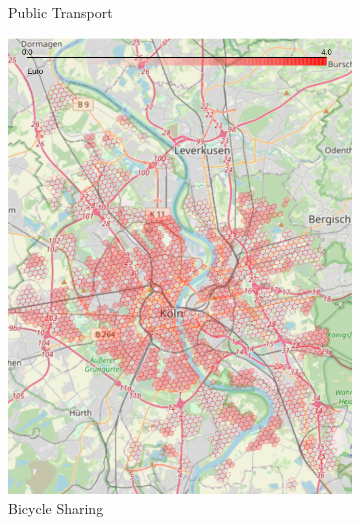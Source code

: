 \begin{figure}
\begin{subfigure}[b]{0.3\textwidth}
         \caption{Public Transport}
         \label{fig:public_transport_cost_map}
     \end{subfigure}
     \hfill
     \begin{subfigure}[b]{0.3\textwidth}
         \centering
         \includegraphics[width=\textwidth]{Figures/results/cost/bicycle_cost_map}
         \caption{Bicycle Sharing}
         \label{fig:bicycle_cost_map}
     \end{subfigure}
     \hfill
     \begin{subfigure}[b]{0.3\textwidth}
         \centering

\end{subfigure}
\end{figure}
